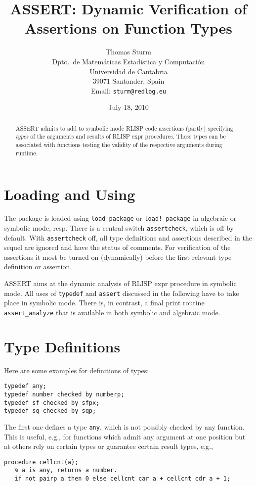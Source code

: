 \documentclass{article}
\begin{document}
\title{ASSERT: Dynamic Verification of Assertions on Function Types}
\author{Thomas Sturm\\
Dpto.~de Matemáticas Estadística y Computación\\
Universidad de Cantabria\\
39071 Santander, Spain\\
Email: \texttt{sturm@redlog.eu}}
\date{July 18, 2010}
\maketitle

\begin{abstract}
  ASSERT admits to add to symbolic mode RLISP code assertions (partly)
  specifying \emph{types} of the arguments and results of RLISP expr
  procedures. These types can be associated with functions testing the
  validity of the respective arguments during runtime.
\end{abstract}

\section{Loading and Using}
The package is loaded using \texttt{load\_package} or
\texttt{load!-package} in algebraic or symbolic mode, resp. There is a
central switch \texttt{assertcheck}, which is off by default. With
\texttt{assertcheck} off, all type definitions and assertions described
in the sequel are ignored and have the status of comments. For
verification of the assertions it most be turned on (dynamically) before
the first relevant type definition or assertion.

ASSERT aims at the dynamic analysis of RLISP expr procedure in symbolic
mode. All uses of \texttt{typedef} and \texttt{assert} discussed in the
following have to take place in symbolic mode. There is, in contrast, a
final print routine \texttt{assert\_analyze} that is available in both
symbolic and algebraic mode.

\section{Type Definitions}
Here are some examples for definitions of types:
\begin{verbatim}
typedef any;
typedef number checked by numberp;
typedef sf checked by sfpx;
typedef sq checked by sqp;
\end{verbatim}
The first one defines a type \texttt{any}, which is not possibly checked
by any function. This is useful, e.g., for functions which admit any
argument at one position but at others rely on certain types or
guarantee certain result types, e.g.,
\begin{verbatim}
procedure cellcnt(a);
   % a is any, returns a number.
   if not pairp a then 0 else cellcnt car a + cellcnt cdr a + 1;
\end{verbatim}
\end{document}
